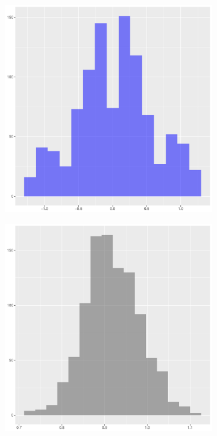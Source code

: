\begin{figure}[htbp]
    \begin{subfigure}[t]{0.45\textwidth}
        \includegraphics[width=\textwidth]{output/bandwidths-difference}
        \label{fig:bandwidths:unif_100_1.0_1h:diff}
    \end{subfigure}
    \begin{subfigure}[t]{0.45\textwidth}
        \includegraphics[width=\textwidth]{output/bandwidths-silverman}

\end{subfigure}
\end{figure}
